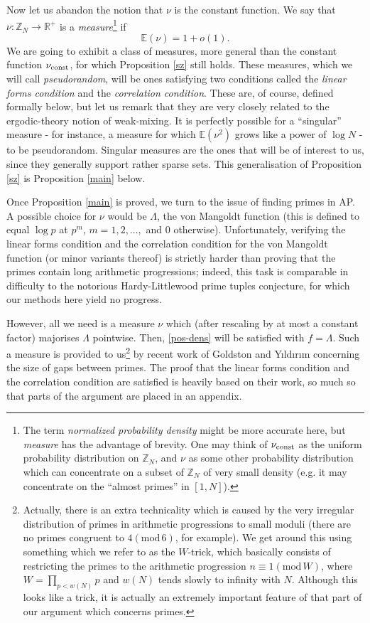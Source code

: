 \documentclass[12pt,a4paper,reqno]{amsart}
\numberwithin{equation}{section}
\theoremstyle{plain}
\theoremstyle{definition}
\newcommand{\md}[1]{\ensuremath{(\mbox{mod}\, #1)}}
\def\vconst{\ensuremath \nu_{\mbox{\scriptsize const}}}
\def\vconstlem{\ensuremath \nu_{\mbox{\scriptsize \textup{const}}}}
\def\Z{{\mathbb Z}}
\def\E{{\mathbb E}}
\def\R{{\mathbb R}}
\def\w{w}
\def\vs{\vspace{11pt}}
\def\ni{\noindent}
\def\emph#1{{\it #1}}
\begin{document}
\ni Now let us abandon the notion that $\nu$ is the constant function. We say that $\nu : \mathbb{Z}_N \rightarrow \R^+$ is a \textit{measure}\footnote{The term \emph{normalized probability density} might be more accurate here, but \emph{measure} has the advantage of brevity.
One may think of $\vconstlem$ as the uniform probability distribution on $\Z_N$, and $\nu$ as some other probability distribution which can concentrate on a subset of $\Z_N$ of very small density (e.g. it may concentrate on the ``almost primes'' in $[1,N]$).} if 
\begin{equation}\label{numean}
\mathbb{E}(\nu) = 1 + o(1). 
\end{equation}
We are going to exhibit a class of measures, more general than the constant function $\vconst$, for which Proposition \ref{sz} still holds. These measures, which we will call \textit{pseudorandom}, will be ones satisfying two conditions called the \textit{linear forms condition} and the \textit{correlation condition}. These are, of course, defined formally below, but let us remark that they are very closely related to the ergodic-theory notion of weak-mixing. It is perfectly possible for a ``singular'' measure - for instance, a measure for which $\E(\nu^2)$ grows like a power of $\log N$ - to be pseudorandom. Singular measures are the ones that will be of interest to us, since they generally support rather sparse sets. This generalisation of Proposition \ref{sz} is Proposition \ref{main} below.\vs

\ni Once Proposition \ref{main} is proved, we turn to the issue of finding primes in AP. A possible choice for $\nu$ would be $\Lambda$, the von Mangoldt function (this is defined to equal $\log p$ at $p^m$, $m = 1,2,\dots,$ and $0$ otherwise). Unfortunately, verifying the linear forms condition and the correlation condition for the von Mangoldt function (or minor variants thereof) is strictly harder than proving that the primes contain long arithmetic progressions; indeed, this task is comparable in difficulty to the notorious Hardy-Littlewood prime tuples conjecture, for which our methods here yield no progress.\vs

\ni However, all we need is a measure $\nu$ which (after rescaling by at most a constant factor) majorises $\Lambda$ pointwise. Then, \eqref{pos-dens} will be satisfied with $f = \Lambda$. Such a measure is provided to us\footnote{Actually, there is an extra technicality which is caused by the very irregular distribution of primes in arithmetic progressions to small moduli (there are no primes congruent to $4 \md{6}$, for example). We get around this using something which we refer to as the $W$-trick, which basically consists of restricting the primes to the arithmetic progression $n \equiv 1 \md{W}$, where $W = \prod_{p < \w(N)} p$ and $w(N)$ tends slowly to infinity with $N$. Although this looks like a trick, it is actually an extremely important feature of that part of our argument which concerns primes.} by recent work of Goldston and Y{\i}ld{\i}r{\i}m \cite{goldston-yildirim} concerning the size of gaps between primes. The proof that the linear forms condition and the correlation condition are satisfied is heavily based on their work, so much so that parts of the argument are placed in an appendix.\vs
\end{document}
